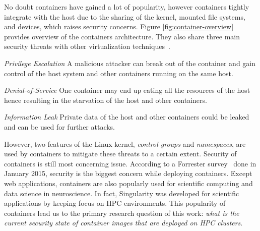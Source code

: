 \documentclass[a4paper,num-refs]{oup-contemporary}
\begin{document}
No doubt containers have gained a lot of popularity, however containers tightly
integrate with the host due to the sharing of the kernel, 
mounted file systems, and devices, which raises security
concerns. Figure \ref{fig:container-overview} provides overview of the containers architecture.
They also share three main security threats with other virtualization
techniques~\cite{gantikow2016providing}.

\textit{Privilege Escalation} A malicious attacker can break out of the container
and gain control of the host system and other containers running on the same host.

\textit{Denial-of-Service} One container may end up eating all the resources of the
host hence resulting in the starvation of the host and other containers.

\textit{Information Leak} Private data of the host and other containers could be
leaked and can be used for further attacks.


However, two features of the Linux kernel, \textit{control groups} and \textit{namespaces},
are used by containers to mitigate these threats to a certain extent. Security
of containers is still most concerning issue. According to a Forrester survey~\cite{bettini2015vulnerability}
done in January 2015, security is the
biggest concern while deploying containers.
Except web applications, containers are also popularly used for scientific computing
and data science in neuroscience. In fact, Singularity was developed for scientific applications
by keeping focus on HPC environments. This popularity of containers lead us to the
primary research question of this work: \textit{what is the current security state of
container images that are deployed on HPC clusters}.
\end{document}
